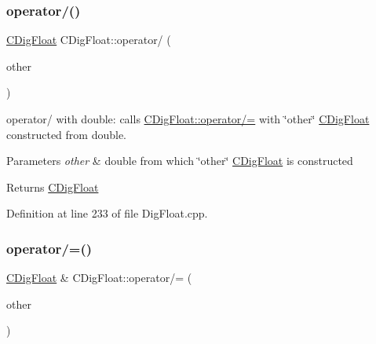 \mbox{\label{classCDigFloat_a4e9cc3b14f2b5a6d704957fb1a8de1a2}} 
\subsubsection{\texorpdfstring{operator/()}{operator/()}\hspace{0.1cm}{\footnotesize\ttfamily [2/2]}}
{\footnotesize\ttfamily \hyperlink{classCDigFloat}{C\+Dig\+Float} C\+Dig\+Float\+::operator/ (\begin{DoxyParamCaption}\item[{const double}]{other }\end{DoxyParamCaption})}



operator/ with double\+: calls \hyperlink{classCDigFloat_a53d3939dfc89d172f1bf803a46bc3369}{C\+Dig\+Float\+::operator/=} with \char`\"{}other\char`\"{} \hyperlink{classCDigFloat}{C\+Dig\+Float} constructed from double. 


\begin{DoxyParams}{Parameters}
{\em other} & double from which \char`\"{}other\char`\"{} \hyperlink{classCDigFloat}{C\+Dig\+Float} is constructed \\
\hline
\end{DoxyParams}
\begin{DoxyReturn}{Returns}
\hyperlink{classCDigFloat}{C\+Dig\+Float} 
\end{DoxyReturn}


Definition at line 233 of file Dig\+Float.\+cpp.

\mbox{\label{classCDigFloat_a53d3939dfc89d172f1bf803a46bc3369}} 
\subsubsection{\texorpdfstring{operator/=()}{operator/=()}\hspace{0.1cm}{\footnotesize\ttfamily [1/2]}}
{\footnotesize\ttfamily \hyperlink{classCDigFloat}{C\+Dig\+Float} \& C\+Dig\+Float\+::operator/= (\begin{DoxyParamCaption}\item[{const \hyperlink{classCDigFloat}{C\+Dig\+Float} \&}]{other }\end{DoxyParamCaption})}



